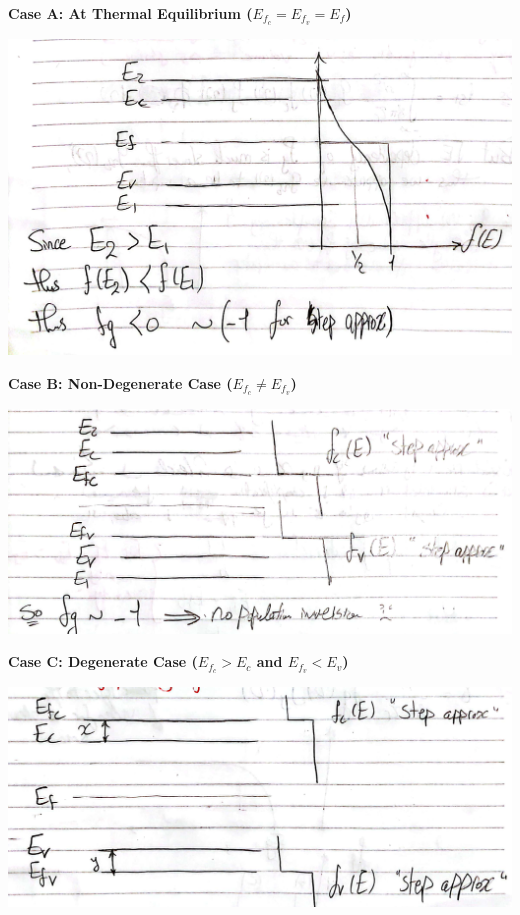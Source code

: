 \documentclass[11pt]{article}
\begin{document}
\pagebreak
\textbf{Case A: At Thermal Equilibrium ($E_{f_c} = E_{f_v} = E_f$)}
\begin{center}
    \includegraphics[scale=0.6]{8.png}
\end{center}
\textbf{Case B: Non-Degenerate Case ($E_{f_c} \neq E_{f_v}$)}
\begin{center}
    \includegraphics[scale=0.6]{9.png}
\end{center}
\textbf{Case C: Degenerate Case ($E_{f_c} > E_c$ and $E_{f_v} < E_v$)}
\begin{center}
    \includegraphics[scale=0.6]{10.png}
\end{center}
\end{document}
